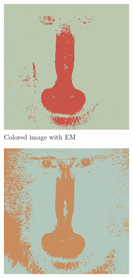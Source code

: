 \documentclass[sigconf,authorversion]{acmart}
\begin{document}
\begin{figure}[hbtp]
\begin{subfigure}[b]{0.25\textwidth}
      \includegraphics[width=\textwidth]{../outputs/baboon_2_hsv_colored_gmm.png}
      \caption{Colored image with EM}
      \label{subfig:baboon_hsv_gmm}
  \end{subfigure}
  \hspace{0.05\textwidth}
  \begin{subfigure}[b]{0.25\textwidth}
      \includegraphics[width=\textwidth]{../outputs/baboon_2_hsv_colored_birch.png}

\end{subfigure}
\end{figure}
\end{document}
